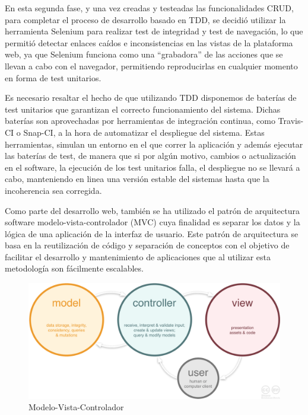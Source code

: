 \documentclass[a4paper,11pt]{book}
\begin{document}
En esta segunda fase, y una vez creadas y testeadas las funcionalidades CRUD, para completar el proceso de desarrollo basado en TDD,  se decidió utilizar la herramienta Selenium\cite{sele} para realizar test de integridad y test de navegación, lo que permitió detectar enlaces caídos e inconsistencias en las vistas de la plataforma web, ya que Selenium funciona como una “grabadora” de las acciones que se llevan a cabo con el navegador, permitiendo reproducirlas en cualquier momento en forma de test unitarios.

Es necesario resaltar el hecho de que utilizando TDD disponemos de baterías de test unitarios que garantizan el correcto funcionamiento del sistema. Dichas baterías son aprovechadas por herramientas de integración continua,  como Travis-CI o Snap-CI, a la hora de automatizar el despliegue del sistema. Estas herramientas, simulan un entorno en el que correr la aplicación y además ejecutar las baterías de test, de manera que si por algún motivo, cambios o actualización en el software, la ejecución de los test unitarios falla, el despliegue no se llevará a cabo, manteniendo en linea una versión estable del sistemas hasta que la incoherencia sea corregida. 

Como parte del desarrollo web, también se ha utilizado el patrón de arquitectura software modelo-vista-controlador (MVC)\cite{mvc} cuya finalidad es separar los datos y la lógica de una aplicación de la interfaz de usuario. Este patrón de arquitectura se basa en la reutilización de código y separación de conceptos con el objetivo de facilitar el desarrollo y mantenimiento de aplicaciones que al utilizar esta metodología son fácilmente escalables. 

\begin{figure}[H] 
\centering 
\includegraphics[scale=0.25]{imagenes/desarrollo_herramienta/mvc.png}
\caption{ Modelo-Vista-Controlador\cite{mvc2}  }  
\end{figure} 
\end{document}
